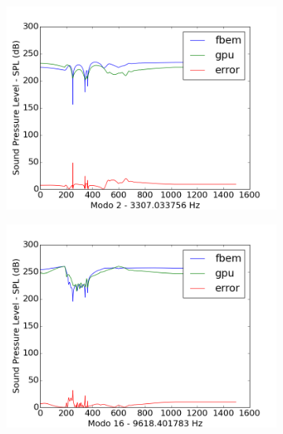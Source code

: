\begin{figure}[ht]
\begin{subfigure}{0.5\textwidth}
	\includegraphics[width=\textwidth]{../data/transfer_test/ceramic_mug/plots/ceramic_mug-tfv-0_2.png}
	\label{fig:coef_mug_2}
\end{subfigure}
\begin{subfigure}{0.5\textwidth}
	\centering
	\includegraphics[width=\textwidth]{../data/transfer_test/ceramic_mug/plots/ceramic_mug-tfv-0_16.png}
	\label{fig:coef_mug_16}
\end{subfigure}%
\begin{subfigure}{0.5\textwidth}
	\centering

\end{subfigure}
\end{figure}
